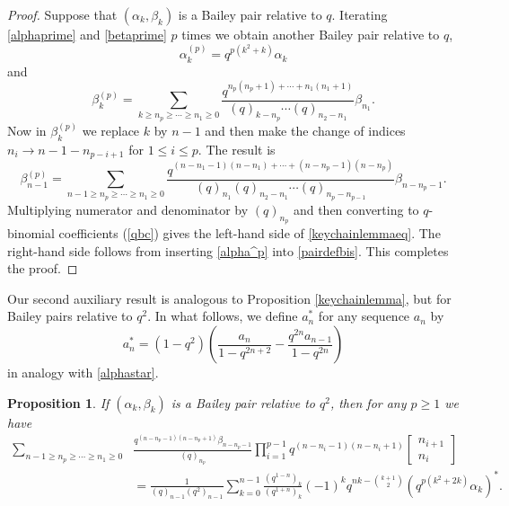 \documentclass[11pt,reqno]{amsart}
\newtheorem{proposition}[theorem]{Proposition}
\theoremstyle{definition}
\numberwithin{equation}{section}
\renewcommand{\=}{\;=\;}
\begin{document}
\begin{proof}
	Suppose that $(\alpha_k,\beta_k)$ is a Bailey pair relative to $q$.   Iterating \eqref{alphaprime} and \eqref{betaprime} $p$ times we obtain another Bailey pair relative to $q$,
	\begin{equation} \label{alpha^p}
		\alpha_k^{(p)} = q^{p(k^2+k)}\alpha_k 
	\end{equation}
	and
	\begin{equation}
		\beta_k^{(p)} = \sum_{k \geq n_p \geq \cdots \geq n_1\geq 0} \frac{q^{n_p(n_p+1) + \cdots + n_1(n_1+1)}}{(q)_{k-n_p} \cdots (q)_{n_2-n_1}} \beta_{n_1}.
	\end{equation}
	Now in $\beta_k^{(p)}$ we replace $k$ by $n-1$ and then make the change of indices $n_i \rightarrow n - 1 - n_{p-i+1}$ for $1 \leq i \leq p$.   The result is
	\begin{equation}
		\beta_{n-1}^{(p)} = \sum_{n-1 \geq n_p \geq \cdots \geq n_1\geq 0} \frac{q^{(n - n_1 - 1)(n- n_1) + \cdots + (n-n_p-1)(n-n_p)}}{(q)_{n_1} (q)_{n_2-n_1} \cdots (q)_{n_p-n_{p-1}}} \beta_{n -n_p -1}.
	\end{equation}
	Multiplying numerator and denominator by $(q)_{n_p}$ and then converting to $q$-binomial coefficients (\ref{qbc}) gives the left-hand side of \eqref{keychainlemmaeq}.   The right-hand side follows from inserting \eqref{alpha^p} into \eqref{pairdefbis}.    This completes the proof.
\end{proof}

Our second auxiliary result is analogous to Proposition \ref{keychainlemma}, but for Bailey pairs relative to $q^2$.  In what follows, we define $a_n^*$ for any sequence $a_n$ by
\begin{equation} \label{astar}
	a_n^* = (1-q^2)\left(\frac{a_n}{1-q^{2n+2}} - \frac{q^{2n}a_{n-1}}{1-q^{2n}} \right)
\end{equation}  
in analogy with \eqref{alphastar}. 
 
\begin{proposition} \label{keychainlemmabis}
If $(\alpha_k,\beta_k)$ is a Bailey pair relative to $q^2$, then for any $p \geq 1$ we have
\begin{equation} \label{keychainlemmabiseq}
\begin{aligned}
\sum_{n-1 \geq n_p \geq \cdots \geq n_1\geq 0}& \frac{q^{(n-n_p-1)(n-n_p+1)}\beta_{n-n_p-1}}{(q)_{n_p}} \prod_{i=1}^{p-1} q^{(n-n_i-1)(n-n_i+1)} \begin{bmatrix} n_{i+1} \\ n_i \end{bmatrix} \\
&= \frac{1}{(q)_{n-1}(q^2)_{n-1}} \sum_{k=0}^{n-1} \frac{(q^{1-n})_k}{(q^{1+n})_k}(-1)^kq^{nk -\binom{k+1}{2}} (q^{p(k^2+2k)} \alpha_k)^*.
\end{aligned}
\end{equation} 
\end{proposition}
\end{document}
